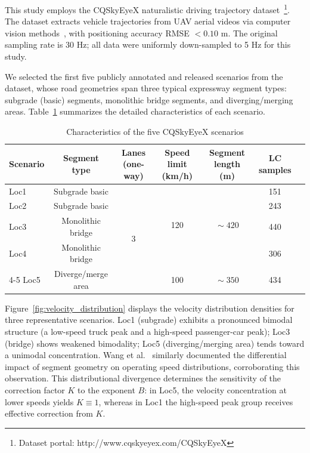 \documentclass[preprint,review,12pt,a4paper]{elsarticle}
\begin{document}
This study employs the CQSkyEyeX naturalistic driving trajectory dataset~\cite{C17}\footnote{Dataset portal: http://www.cqskyeyex.com/CQSkyEyeX}. The dataset extracts vehicle trajectories from UAV aerial videos via computer vision methods~\cite{C24}, with positioning accuracy RMSE $<0.10$ m. The original sampling rate is 30 Hz; all data were uniformly down-sampled to 5 Hz for this study.

We selected the first five publicly annotated and released scenarios from the dataset, whose road geometries span three typical expressway segment types: subgrade (basic) segments, monolithic bridge segments, and diverging/merging areas. Table~\ref{tab:scenes} summarizes the detailed characteristics of each scenario.

\begin{table}[H]
\centering
\caption{Characteristics of the five CQSkyEyeX scenarios}
\label{tab:scenes}
\small
\begin{tabular}{lcccccc}
\toprule
Scenario & Segment type & Lanes (one-way) & Speed limit (km/h) & Segment length (m) & LC samples \\
\midrule
Loc1 & Subgrade basic & \multirow{5}{*}{3} & \multirow{4}{*}{120} & \multirow{4}{*}{$\!\sim\!420$} & 151 \\
Loc2 & Subgrade basic &                    &                      &                               & 243 \\
Loc3 & Monolithic bridge &                  &                      &                               & 440 \\
Loc4 & Monolithic bridge &                  &                      &                               & 306 \\
\cmidrule(lr){4-5}
Loc5 & Diverge/merge area &                & 100                  & $\!\sim\!350$                 & 434 \\
\bottomrule
\end{tabular}
\end{table}

Figure~\ref{fig:velocity_distribution} displays the velocity distribution densities for three representative scenarios. Loc1 (subgrade) exhibits a pronounced bimodal structure (a low-speed truck peak and a high-speed passenger-car peak); Loc3 (bridge) shows weakened bimodality; Loc5 (diverging/merging area) tends toward a unimodal concentration. Wang et al.~\cite{C27} similarly documented the differential impact of segment geometry on operating speed distributions, corroborating this observation. This distributional divergence determines the sensitivity of the correction factor $K$ to the exponent $B$: in Loc5, the velocity concentration at lower speeds yields $K \equiv 1$, whereas in Loc1 the high-speed peak group receives effective correction from $K$.
\end{document}

